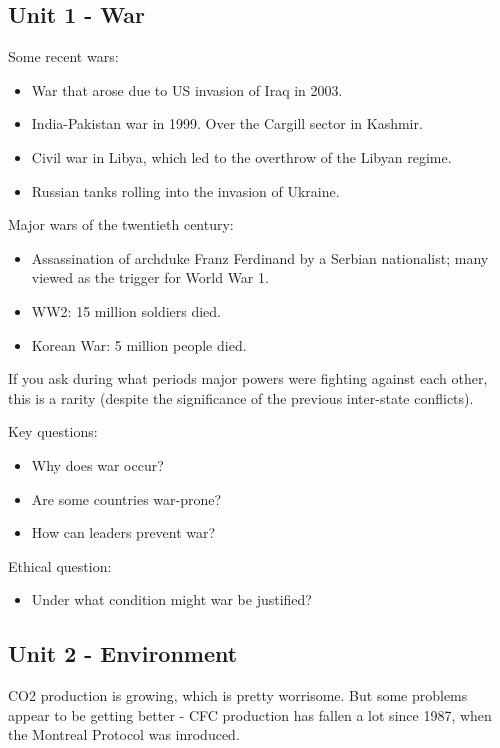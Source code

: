 \documentclass{article}
\begin{document}
\subsection{Unit 1 - War}

Some recent wars:

\begin{itemize}
  \item War that arose due to US invasion of Iraq in 2003.
  \item India-Pakistan war in 1999.  Over the Cargill sector in Kashmir.
  \item Civil war in Libya, which led to the overthrow of the Libyan regime.
  \item Russian tanks rolling into the invasion of Ukraine.
\end{itemize}

Major wars of the twentieth century:

\begin{itemize}
  \item Assassination of archduke Franz Ferdinand by a Serbian nationalist; many viewed as the trigger for World War 1.
  \item WW2: 15 million soldiers died.
  \item Korean War: 5 million people died.
\end{itemize}

If you ask during what periods major powers were fighting against each other, this is a rarity (despite the significance of the previous inter-state conflicts).

Key questions:

\begin{itemize}
  \item Why does war occur?
  \item Are some countries war-prone?
  \item How can leaders prevent war?
\end{itemize}

Ethical question:

\begin{itemize}
  \item Under what condition might war be justified?
\end{itemize}

\subsection{Unit 2 - Environment}

CO2 production is growing, which is pretty worrisome.  But some problems appear to be getting better - CFC production has fallen a lot since 1987, when the Montreal Protocol was inroduced.
\end{document}
